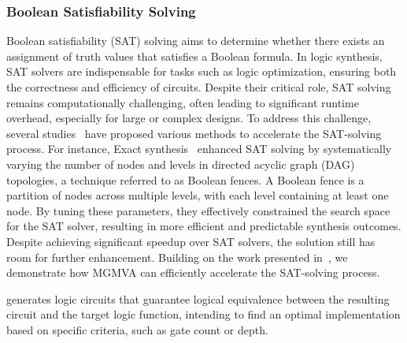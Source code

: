 \subsubsection{Boolean Satisfiability Solving}
\label{sec:sat}
Boolean satisfiability (SAT) solving aims to determine whether there exists an assignment of truth values that satisfies a Boolean formula. 
In logic synthesis, SAT solvers are indispensable for tasks such as logic optimization, ensuring both the correctness and efficiency of circuits. 
Despite their critical role, SAT solving remains computationally challenging, often leading to significant runtime overhead, especially for large or complex designs. 
To address this challenge, several studies~\citep{haaswijk2019sat,shi2023deepgate2, shi2024deepgate3} have proposed various methods to accelerate the SAT-solving process. 
For instance, Exact synthesis~\citep{haaswijk2019sat} enhanced SAT solving by systematically varying the number of nodes and levels in directed acyclic graph (DAG) topologies, a technique referred to as Boolean fences. 
A Boolean fence is a partition of nodes across multiple levels, with each level containing at least one node. 
By tuning these parameters, they effectively constrained the search space for the SAT solver, resulting in more efficient and predictable synthesis outcomes.
Despite achieving significant speedup over SAT solvers, the solution still has room for further enhancement.
Building on the work presented in~\citep{haaswijk2019sat}, we demonstrate how MGMVA can efficiently accelerate the SAT-solving process.

 generates logic circuits that guarantee logical equivalence between the resulting circuit and the target logic function, intending to find an optimal implementation based on specific criteria, such as gate count or depth.

